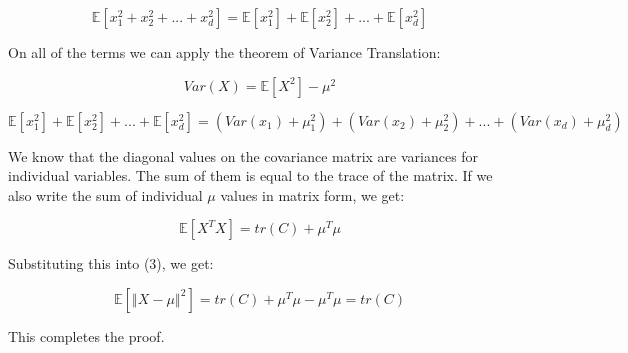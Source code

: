 \documentclass[10pt,letterpaper]{article}
\begin{document}
    \begin{equation}
       \mathbb{E}[x_1^2 + x_2^2 + ... + x_d^2] = 
       \mathbb{E}[x_1^2] + \mathbb{E}[x_2^2] + ... + \mathbb{E}[x_d^2]
    \end{equation}

On all of the terms we can apply the theorem of Variance Translation: 

    \begin{equation}
       Var(X) =  \mathbb{E}[X^2] - \mu^2
    \end{equation}

    \begin{equation}
       \mathbb{E}[x_1^2] + \mathbb{E}[x_2^2] + ... + \mathbb{E}[x_d^2] = (Var(x_1) + \mu_1^2) + (Var(x_2) + \mu_2^2) + ... + (Var(x_d) + \mu_d^2)
    \end{equation}

We know that the diagonal values on the covariance matrix are variances for individual variables. The sum of them is equal to the trace of the matrix. If we also write the sum of individual $\mu$ values in matrix form, we get: 

    \begin{equation}
       \mathbb{E}[X^TX] = tr(C) + \mu^T\mu
    \end{equation}

Substituting this into (3), we get:

    \begin{equation}
       \mathbb{E}[\left \Vert X-\mu \right \Vert ^2] = 
       tr(C) + \mu^T\mu- \mu^T\mu = tr(C)
    \end{equation}

This completes the proof. 
\end{document}
